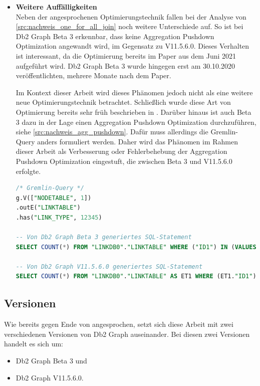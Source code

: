 \begin{itemize}
    \item \textbf{Weitere Auffälligkeiten}\\
    Neben der angesprochenen Optimierungstechnik fallen bei der Analyse von \autoref{src:nachweis_one_for_all_join} noch weitere Unterschiede auf. So ist bei Db2 Graph Beta 3 erkennbar, dass keine Aggregation Pushdown Optimization angewandt wird, im Gegensatz zu V11.5.6.0. Dieses Verhalten ist interessant, da die Optimierung bereits im Paper \cite{sigmod_tian} aus dem Juni 2021 aufgeführt wird. Db2 Graph Beta 3 wurde hingegen erst am 30.10.2020 veröffentlichten, mehrere Monate nach dem Paper. 

    Im Kontext dieser Arbeit wird dieses Phänomen jedoch nicht als eine weitere neue Optimierungstechnik betrachtet. Schließlich wurde diese Art von Optimierung bereits sehr früh beschrieben in \cite{sigmod_tian}. Darüber hinaus ist auch Beta 3 dazu in der Lage einen Aggregation Pushdown Optimization durchzuführen, siehe \autoref{src:nachweis_agg_pushdown}. Dafür muss allerdings die Gremlin-Query anders formuliert werden. Daher wird das Phänomen im Rahmen dieser Arbeit als Verbesserung oder Fehlerbehebung der  Aggregation Pushdown Optimization eingestuft, die zwischen Beta 3 und V11.5.6.0 erfolgte.

\begin{lstlisting}[label=src:nachweis_agg_pushdown,caption={Nachweis für Aggregation Pushdown in Db2 Graph Beta 3},language=SQL]
/* Gremlin-Query */
g.V(["NODETABLE", 1])
.outE("LINKTABLE")
.has("LINK_TYPE", 12345)

-- Von Db2 Graph Beta 3 generiertes SQL-Statement
SELECT COUNT(*) FROM "LINKDB0"."LINKTABLE" WHERE ("ID1") IN (VALUES (1)) AND "LINK_TYPE" = 12345;

-- Von Db2 Graph V11.5.6.0 generiertes SQL-Statement
SELECT COUNT(*) FROM "LINKDB0"."LINKTABLE" AS ET1 WHERE (ET1."ID1") IN (VALUES (1)) AND ET1."LINK_TYPE" = 12345;
\end{lstlisting}
\end{itemize}

\subsection{Versionen}

Wie bereits gegen Ende von  angesprochen, setzt sich diese Arbeit mit zwei verschiedenen Versionen von Db2 Graph auseinander. Bei diesen zwei Versionen handelt es sich um: 

\begin{itemize}
    \item Db2 Graph Beta 3 und
    \item Db2 Graph V11.5.6.0.
\end{itemize}

